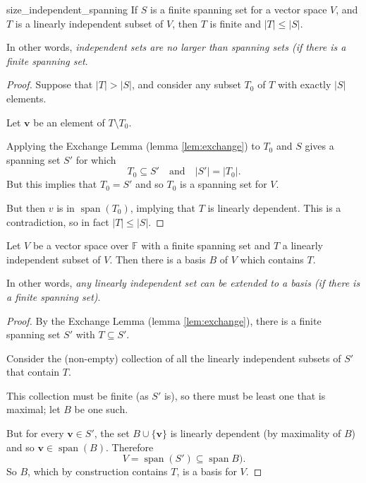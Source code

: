 \begin{corollary}{\cite{math2601_notes}}{size_independent_spanning}
If $S$ is a finite spanning set for a vector space $V$, and $T$ is a linearly independent subset of $V$, then $T$ is finite and $\lvert T \rvert \leq \lvert S \rvert$.

In other words, \textit{independent sets are no larger than spanning sets (if there is a finite spanning set}.

\begin{proof}
Suppose that $\lvert T \rvert > \lvert S \rvert$, and consider any subset $T_0$ of $T$ with exactly $\lvert S \rvert$ elements.

Let $\mathbf{v}$ be an element of $T \setminus T_0$.

Applying the Exchange Lemma (lemma \ref{lem:exchange}) to $T_0$ and $S$ gives a spanning set $S'$ for which
$$ T_0 \subseteq S' \quad \text{and} \quad \lvert S' \rvert = \lvert T_0 \rvert . $$
But this implies that $T_0 = S'$ and so $T_0$ is a spanning set for $V$.

But then $v$ is in $\operatorname{span}(T_0)$, implying that $T$ is linearly dependent. This is a contradiction, so in fact $\lvert T \rvert \leq \lvert S \rvert$.
\end{proof}
\end{corollary}

\begin{theorem}{\cite{math2601_notes}}{}
Let $V$ be a vector space over $\mathbb{F}$ with a finite spanning set and $T$ a linearly independent subset of $V$. Then there is a basis $B$ of $V$ which contains $T$.

In other words, \textit{any linearly independent set can be extended to a basis (if there is a finite spanning set)}.

\begin{proof}
By the Exchange Lemma (lemma \ref{lem:exchange}), there is a finite spanning set $S'$ with $T \subseteq S'$.

Consider the (non-empty) collection of all the linearly independent subsets of $S'$ that contain $T$.

This collection must be finite (as $S'$ is), so there must be least one that is maximal; let $B$ be one such.

But for every $\mathbf{v} \in S'$, the set $B \cup \{\mathbf{v}\}$ is linearly dependent (by maximality of $B$) and so $\mathbf{v} \in \operatorname{span}(B)$. Therefore
$$ V = \operatorname{span}(S') \subseteq \operatorname{span}B) . $$
So $B$, which by construction contains $T$, is a basis for $V$.
\end{proof}
\end{theorem}

